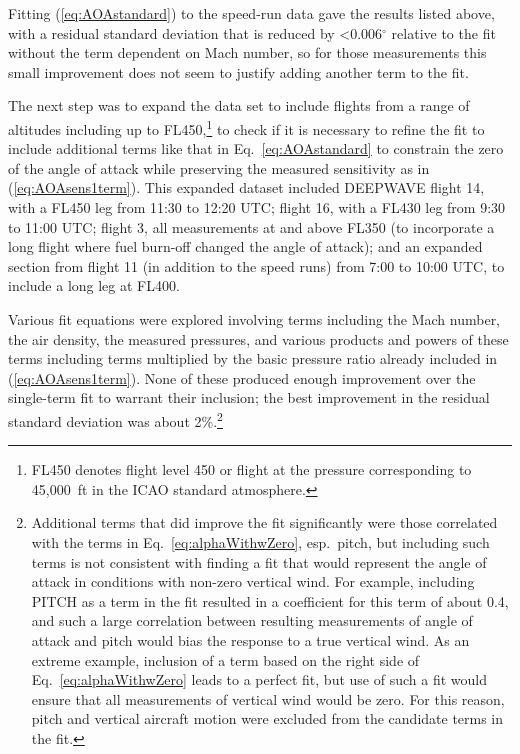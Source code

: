 \documentclass[12pt,twoside,english]{article}\usepackage[]{graphicx}\usepackage[]{color}
\begin{document}
{{Fitting (\ref{eq:AOAstandard}) to the speed-run data gave the results listed above, with a residual standard deviation that is reduced by <0.006$^{\circ}$ relative to the fit without the term dependent on Mach number, so for those measurements this small improvement does not seem to justify adding another term to the fit. %



The next step was to expand the data set to include flights from a range of altitudes including up to FL450,\footnote{FL450 denotes flight level 450 or flight at the pressure corresponding to 45,000~ft in the ICAO standard atmosphere.} to check if it is necessary to refine the fit to include additional terms like that in Eq.~\ref{eq:AOAstandard} to constrain the zero of the angle of attack while preserving the measured sensitivity as in (\ref{eq:AOAsens1term}). This expanded dataset included DEEPWAVE flight 14, with a FL450 leg from 11:30 to 12:20 UTC; flight 16, with a FL430 leg from 9:30 to 11:00 UTC; flight 3, all measurements at and above FL350 (to incorporate a long flight where fuel burn-off changed the angle of attack); and an expanded section from flight 11 (in addition to the speed runs) from 7:00 to 10:00 UTC, to include a long leg at FL400. 

Various fit equations were explored involving terms including the Mach number, the air density, the measured pressures, and various products and powers of these terms including terms multiplied by the basic pressure ratio already included in (\ref{eq:AOAsens1term}). None of these produced enough improvement over the single-term fit to warrant their inclusion; the best improvement in the residual standard deviation was about 2\%.\footnote{Additional terms that did improve the fit significantly were those correlated with the terms in Eq.~\ref{eq:alphaWithwZero}, esp.~pitch, but including such terms is not consistent with finding a fit that would represent the angle of attack in conditions with non-zero vertical wind. For example, including \textquotedbl{}PITCH\textquotedbl{} as a term in the fit resulted in a coefficient for this term of about 0.4, and such a large correlation between resulting measurements of angle of attack and pitch would bias the response to a true vertical wind. As an extreme example, inclusion of a term based on the right side of Eq.~\ref{eq:alphaWithwZero} leads to a perfect fit, but use of such a fit would ensure that all measurements of vertical wind would be zero. For this reason, pitch and vertical aircraft motion were excluded from the candidate terms in the fit.} 



}}
\end{document}
